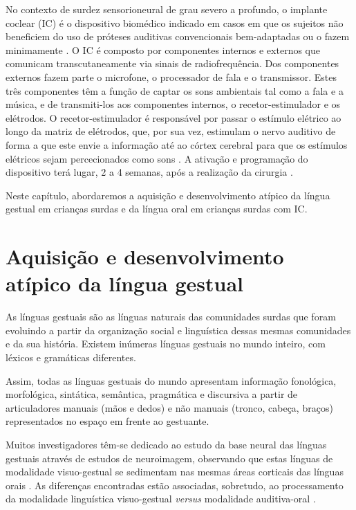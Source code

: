 \documentclass[output=paper,colorlinks,citecolor=brown,booklanguage=portuguese]{langscibook}
\begin{document}
No contexto de surdez sensorioneural de grau severo a profundo, o implante coclear (IC) é o dispositivo biomédico indicado em casos em que os sujeitos não beneficiem do uso de próteses auditivas convencionais bem-adaptadas ou o fazem minimamente \citep{Monteiro2018, Paco2010}. O IC é composto por componentes internos e externos que comunicam transcutaneamente via sinais de radiofrequência. Dos componentes externos fazem parte o microfone, o processador de fala e o transmissor. Estes três componentes têm a função de captar os sons ambientais tal como a fala e a música, e de transmiti-los aos componentes internos, o recetor-estimulador e os elétrodos. O recetor-estimulador é responsável por passar o estímulo elétrico ao longo da matriz de elétrodos, que, por sua vez, estimulam o nervo auditivo de forma a que este envie a informação até ao córtex cerebral para que os estímulos elétricos sejam percecionados como sons \citep{Cardona2013}. A ativação e programação do dispositivo terá lugar, 2 a 4 semanas, após a realização da cirurgia \citep{Yawn2015}.

Neste capítulo, abordaremos a aquisição e desenvolvimento atípico da língua gestual em crianças surdas e da língua oral em crianças surdas com IC. 

\section{Aquisição e desenvolvimento atípico da língua gestual}

As línguas gestuais são as línguas naturais das comunidades surdas que foram evoluindo a partir da organização social e linguística dessas mesmas comunidades e da sua história. Existem inúmeras línguas gestuais no mundo inteiro, com léxicos e gramáticas diferentes.

Assim, todas as línguas gestuais do mundo apresentam informação fonológica, morfológica, sintática, semântica, pragmática e discursiva a partir de articuladores manuais (mãos e dedos) e não manuais (tronco, cabeça, braços) representados no espaço em frente ao gestuante.

Muitos investigadores têm-se dedicado ao estudo da base neural das línguas gestuais através de estudos de neuroimagem, observando que estas línguas de modalidade visuo-gestual se sedimentam nas mesmas áreas corticais das línguas orais \citep{Cheng2019, MacSweeney2008}. As diferenças encontradas estão associadas, sobretudo, ao processamento da modalidade linguística visuo-gestual \emph{versus} modalidade auditiva-oral \citep{Emmorey2007}.
\end{document}
